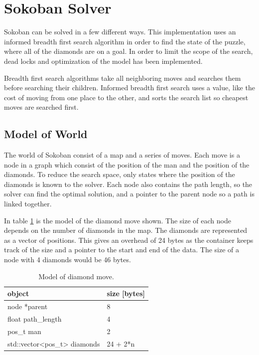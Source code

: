 \section{Sokoban Solver}
Sokoban can be solved in a few different ways. 
This implementation uses an informed breadth first search algorithm in order to find the state of the puzzle, where all of the diamonds are on a goal.
In order to limit the scope of the search, dead locks and optimization of the model has been implemented.

Breadth first search algorithms take all neighboring moves and searches them before searching their children.
Informed breadth first search uses a value, like the cost of moving from one place to the other, and sorts the search list so cheapest moves are searched first.

\subsection{Model of World}
The world of Sokoban consist of a map and a series of moves.
Each move is a node in a graph which consist of the position of the man and the position of the diamonds.
To reduce the search space, only states where the position of the diamonds is known to the solver.
Each node also contains the path length, so the solver can find the optimal solution, and a pointer to the parent node so a path is linked together.

In table \ref{fig:model_node} is the model of the diamond move shown.
The size of each node depends on the number of diamonds in the map.
The diamonds are represented as a vector of positions.
This gives an overhead of 24 bytes as the container keeps track of the size and a pointer to the start and end of the data.
The size of a node with 4 diamonds would be 46 bytes.

\begin{table}
\centering
 \begin{tabular}{l|l}
    object                         & size [bytes]\\ \hline
    node *parent                   & 8 \\ 
    float path\_length             & 4 \\
    pos\_t man                     & 2 \\
    std::vector<pos\_t> diamonds   & 24 + 2*n \\
 \end{tabular}
 \caption{Model of diamond move.}
 \label{fig:model_node}
\end{table}

